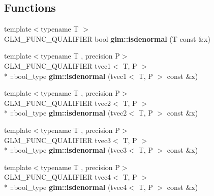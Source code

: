\subsection*{Functions}
\begin{DoxyCompactItemize}
\item 
\hypertarget{namespaceglm_ae1eb587972c0a1c492f6c7026e34ca4f}{{\footnotesize template$<$typename T $>$ }\\G\-L\-M\-\_\-\-F\-U\-N\-C\-\_\-\-Q\-U\-A\-L\-I\-F\-I\-E\-R bool {\bfseries glm\-::isdenormal} (T const \&x)}\label{namespaceglm_ae1eb587972c0a1c492f6c7026e34ca4f}

\item 
\hypertarget{namespaceglm_aa92fc157ce32f36f5046a1fe9cbf06a6}{{\footnotesize template$<$typename T , precision P$>$ }\\G\-L\-M\-\_\-\-F\-U\-N\-C\-\_\-\-Q\-U\-A\-L\-I\-F\-I\-E\-R tvec1$<$ T, P $>$\\*
\-::bool\-\_\-type {\bfseries glm\-::isdenormal} (tvec1$<$ T, P $>$ const \&x)}\label{namespaceglm_aa92fc157ce32f36f5046a1fe9cbf06a6}

\item 
\hypertarget{namespaceglm_ac32f35a22d48d844fdb5818a969a813e}{{\footnotesize template$<$typename T , precision P$>$ }\\G\-L\-M\-\_\-\-F\-U\-N\-C\-\_\-\-Q\-U\-A\-L\-I\-F\-I\-E\-R tvec2$<$ T, P $>$\\*
\-::bool\-\_\-type {\bfseries glm\-::isdenormal} (tvec2$<$ T, P $>$ const \&x)}\label{namespaceglm_ac32f35a22d48d844fdb5818a969a813e}

\item 
\hypertarget{namespaceglm_adbc1b50d093dfcbd800c1d317f798599}{{\footnotesize template$<$typename T , precision P$>$ }\\G\-L\-M\-\_\-\-F\-U\-N\-C\-\_\-\-Q\-U\-A\-L\-I\-F\-I\-E\-R tvec3$<$ T, P $>$\\*
\-::bool\-\_\-type {\bfseries glm\-::isdenormal} (tvec3$<$ T, P $>$ const \&x)}\label{namespaceglm_adbc1b50d093dfcbd800c1d317f798599}

\item 
\hypertarget{namespaceglm_a0807268548a810387d609bdd544ed7e9}{{\footnotesize template$<$typename T , precision P$>$ }\\G\-L\-M\-\_\-\-F\-U\-N\-C\-\_\-\-Q\-U\-A\-L\-I\-F\-I\-E\-R tvec4$<$ T, P $>$\\*
\-::bool\-\_\-type {\bfseries glm\-::isdenormal} (tvec4$<$ T, P $>$ const \&x)}\label{namespaceglm_a0807268548a810387d609bdd544ed7e9}


\end{DoxyCompactItemize}
